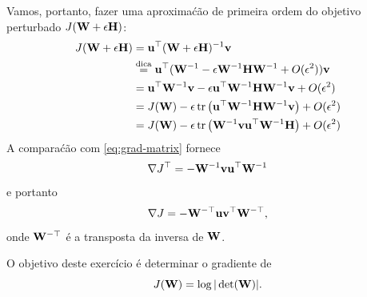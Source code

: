 \begin{exenumerate}
\begin{solution}
        Vamos, portanto, fazer uma aproxima\'c\~ao de primeira ordem do objetivo perturbado $J(\mathbf{W} + \epsilon \mathbf{H})$: 
        \begin{align}
            J(\mathbf{W} + \epsilon\mathbf{H}) &= \mathbf{u}^\top(\mathbf{W} + \epsilon\mathbf{H})^{-1}\mathbf{v} \\
            &\overset{\textrm{dica}}{=} \mathbf{u}^\top(\mathbf{W}^{-1} - \epsilon \mathbf{W}^{-1}\mathbf{H} \mathbf{W}^{-1} + O(\epsilon^2))\mathbf{v} \\
            &= \mathbf{u}^\top \mathbf{W}^{-1}\mathbf{v} - \epsilon \mathbf{u}^\top\mathbf{W}^{-1}\mathbf{H}\mathbf{W}^{-1}\mathbf{v} + O(\epsilon^2) \\
            &= J(\mathbf{W}) -  \epsilon \operatorname{tr}\left(\mathbf{u}^\top\mathbf{W}^{- 1}\mathbf{H}\mathbf{W}^{-1}\mathbf{v}\right) + O(\epsilon^2) \\
            &= J(\mathbf{W}) - \epsilon \operatorname{tr}\left(\mathbf{W}^{-1}\mathbf{v}\mathbf{u}^\top\mathbf{W}^{-1}\mathbf{H}\right) + O(\epsilon^2)
        \end{align}
        A compara\'c\~ao com \eqref{eq:grad-matrix} fornece
        \begin{equation}
            \nabla J^\top = -\mathbf{W}^{-1}\mathbf{v}\mathbf{u}^\top\mathbf{W}^{-1}
        \end{equation}
        e portanto
        \begin{equation}
            \nabla J = -\mathbf{W}^{-\top}\mathbf{u}\mathbf{v}^\top\mathbf{W}^{-\top},
        \end{equation}
        onde $\mathbf{W}^{-\top}$ \'e a transposta da inversa de $\mathbf{W}$.
        
    \end{solution}
\end{exenumerate}


\label{ex:grad-log-det}
O objetivo deste exerc\'icio \'e determinar o gradiente de
\begin{equation}
    J(\mathbf{W}) = \log | \det(\mathbf{W})|.
\end{equation}

